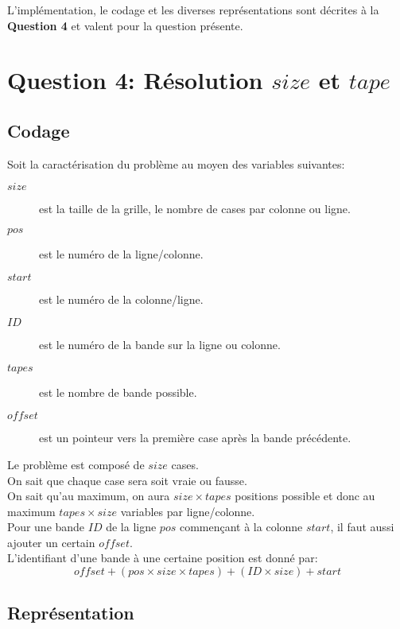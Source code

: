 \documentclass[a4paper,12pt]{report}
\begin{document}
L'implémentation, le codage et les diverses représentations sont décrites à la \textbf{Question 4} et valent pour la question présente.

\chapter{Question 4: Résolution $size$ et $tape$}

\section{Codage}
%

Soit la caractérisation du problème au moyen des variables suivantes:
\begin{description}
\item[$size$] est la taille de la grille, le nombre de cases par colonne ou ligne.
\item[$pos$] est le numéro de la ligne/colonne.
\item[$start$] est le numéro de la colonne/ligne.
\item[$ID$] est le numéro de la bande sur la ligne ou colonne.
\item[$tapes$] est le nombre de bande possible.
\item[$offset$] est un pointeur vers la première case après la bande précédente.\\
\end{description}						


Le problème est composé de $size$ cases.\\
On sait que chaque case sera soit vraie ou fausse.\\
On sait qu'au maximum, on aura $size \times tapes$ positions possible et donc au maximum $tapes\times size$ variables par ligne/colonne.\\
Pour une bande $ID$ de la ligne $pos$ commençant à la colonne $start$, il faut aussi ajouter un certain $offset$.\\

L'identifiant d'une bande à une certaine position est donné par:
$$offset+ (pos \times size \times tapes) + (ID \times size) + start$$


\section{Représentation}
\end{document}
